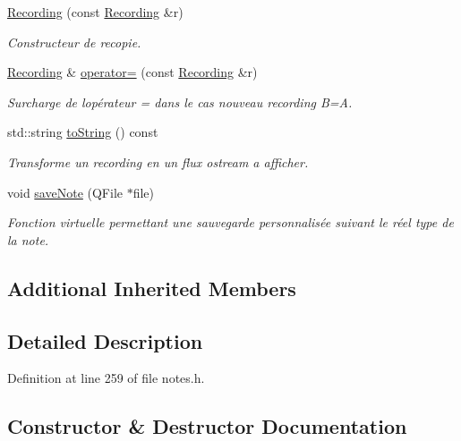 \begin{DoxyCompactItemize}
\hyperlink{class_recording_ab354d60b8ecb06699378a849f6143ac6}{Recording} (const \hyperlink{class_recording}{Recording} \&r)
\begin{DoxyCompactList}\small\item\em Constructeur de recopie. \end{DoxyCompactList}\item 
\hyperlink{class_recording}{Recording} \& \hyperlink{class_recording_ac5c7522d695c8a657f5e801df97a9e06}{operator=} (const \hyperlink{class_recording}{Recording} \&r)
\begin{DoxyCompactList}\small\item\em Surcharge de l\textquotesingle{}opérateur = dans le cas nouveau recording B=A. \end{DoxyCompactList}\item 
std\+::string \hyperlink{class_recording_a9f403a39bec2db40c9171a6c3a20942d}{to\+String} () const
\begin{DoxyCompactList}\small\item\em Transforme un recording en un flux ostream a afficher. \end{DoxyCompactList}\item 
void \hyperlink{class_recording_a99e10c8a8c13bce5f70195b6c30a1cc9}{save\+Note} (Q\+File $\ast$file)
\begin{DoxyCompactList}\small\item\em Fonction virtuelle permettant une sauvegarde personnalisée suivant le réel type de la note. \end{DoxyCompactList}\end{DoxyCompactItemize}
\subsection*{Additional Inherited Members}


\subsection{Detailed Description}


Definition at line 259 of file notes.\+h.



\subsection{Constructor \& Destructor Documentation}
\mbox{\label{class_recording_a2e3359660cd7573807fb46c15daf4e78}} 
